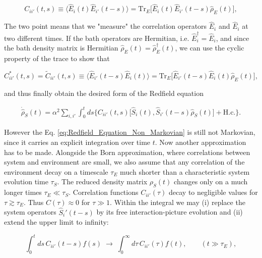 \begin{equation}
	C_{ii'}(t, s) \equiv \langle \hat{E}_{i}(t) \hat{E}_{i'}(t-s) \rangle = \mathrm{Tr}_E \big[\hat{E}_{i}(t) \hat{E}_{i'}(t-s) \hat{\rho}_E(t)\big],
	\label{eq:Environment_Correlation_Function}
\end{equation}

\noindent
The two point means that we "measure" the correlation operators $\hat{E}_{i}$ and $\hat{E}_{i}$ at two different times.
If the bath operators are Hermitian, i.e. $\hat{E}_i^\dagger = \hat{E}_i$,
and since the bath density matrix is Hermitian $ \hat{\rho}_E(t) = \hat{\rho}_E^\dagger(t)$, we can use the cyclic property of the trace to show that

\begin{equation}
	C^{*}_{ii'}(t, s) = \tilde{C}_{ii'}(t, s) \equiv \langle \hat{E}_{i'}(t-s) \hat{E}_{i}(t) \rangle = \mathrm{Tr}_E \big[\hat{E}_{i'}(t-s) \hat{E}_{i}(t) \hat{\rho}_E(t)\big],
	\label{eq:Environment_Correlation_Function_Conjugate}
\end{equation}

\noindent
and thus finally obtain the desired form of the Redfield equation

\begin{align}
	\dot{\hat{\rho}}_S(t) = \alpha^2  \sum_{i, i'} \int_0^t ds
	\bigg\{
	C_{ii'}(t, s) \big[ \hat{S}_i(t),  \hat{S}_{i'}(t-s) \hat{\rho}_S(t) \big] + \text{H.c.}
	\bigg\}.
	\label{eq:Redfield_Equation_Non_Markovian}
\end{align}


\vspace{1em}
\noindent
However the Eq. \eqref{eq:Redfield_Equation_Non_Markovian} is still not Markovian, since it carries an explicit integration over time $t$.
Now another approximation has to be made. Alongside the Born approximation, where correlations between system and environment are small, we also assume that any correlation of the environment decay on a timescale $\tau_E$ much shorter than a characteristic system evolution time $\tau_S$. The reduced density matrix $\rho_S(t)$ changes only on a much longer times $\tau_E \ll \tau_S$. Correlation functions $C_{ii'}(\tau)$ decay to negligible values for $\tau \gtrsim \tau_E$. Thus $ C(\tau) \approx 0$ for $\tau \gg 1$. Within the integral we may (i) replace the system operators $\hat{S}_i'(t-s)$ by its free interaction-picture evolution and (ii) extend the upper limit to infinity:

\begin{equation}
	\int_0^t ds\, C_{ii'}(t-s) f(s) \; \longrightarrow \; \int_0^{\infty} d\tau\, C_{ii'}(\tau) f(t), \qquad (t \gg \tau_E),
	\label{eq:Markov_extension_rule}
\end{equation}

